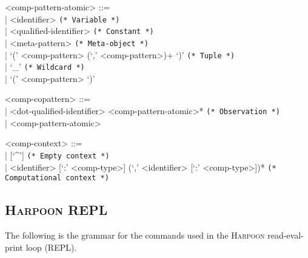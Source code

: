 \documentclass[11pt]{article}
\newcommand{\Harpoon}{\textsc{Harpoon}\xspace}
\begin{document}
\begin{grammar}
<comp-pattern-atomic> ::= \hfill\\
| <identifier> \hfill \texttt{(* Variable *)}\\
| <qualified-identifier> \hfill \texttt{(* Constant *)}\\
| <meta-pattern> \hfill \texttt{(* Meta-object *)} \\
| `(' <comp-pattern> (`,' <comp-pattern>)+ `)' \hfill \texttt{(* Tuple *)}\\
| `_' \hfill \texttt{(* Wildcard *)}\\
| `(' <comp-pattern> `)'

<comp-copattern> ::= \hfill\\
| <dot-qualified-identifier> <comp-pattern-atomic>* \hfill \texttt{(* Observation *)}\\
| <comp-pattern-atomic>

<comp-context> ::= \hfill\\
| [`^'] \hfill \texttt{(* Empty context *)}\\
| <identifier> [`:' <comp-type>] (`,' <identifier> [`:' <comp-type>])* \hfill \texttt{(* Computational context *)}
\end{grammar}

\subsection{\Harpoon REPL}\label{section:syntax-harpoon-repl}

The following is the grammar for the commands used in the \Harpoon read-eval-print loop (REPL).
\end{document}

